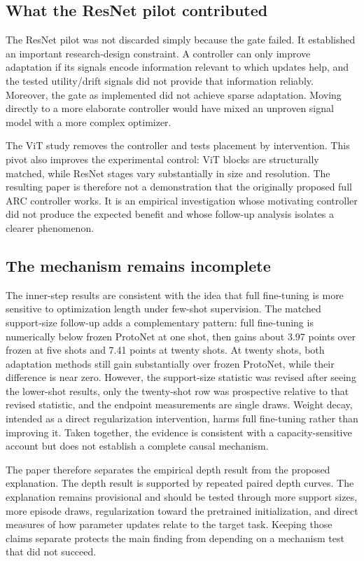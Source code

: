 \documentclass[11pt]{article}
\begin{document}
\subsection{What the ResNet pilot contributed}

The ResNet pilot was not discarded simply because the gate failed. It established an important research-design constraint. A controller can only improve adaptation if its signals encode information relevant to which updates help, and the tested utility/drift signals did not provide that information reliably. Moreover, the gate as implemented did not achieve sparse adaptation. Moving directly to a more elaborate controller would have mixed an unproven signal model with a more complex optimizer.

The ViT study removes the controller and tests placement by intervention. This pivot also improves the experimental control: ViT blocks are structurally matched, while ResNet stages vary substantially in size and resolution. The resulting paper is therefore not a demonstration that the originally proposed full ARC controller works. It is an empirical investigation whose motivating controller did not produce the expected benefit and whose follow-up analysis isolates a clearer phenomenon.

\subsection{The mechanism remains incomplete}

The inner-step results are consistent with the idea that full fine-tuning is more sensitive to optimization length under few-shot supervision. The matched support-size follow-up adds a complementary pattern: full fine-tuning is numerically below frozen ProtoNet at one shot, then gains about 3.97 points over frozen at five shots and 7.41 points at twenty shots. At twenty shots, both adaptation methods still gain substantially over frozen ProtoNet, while their difference is near zero. However, the support-size statistic was revised after seeing the lower-shot results, only the twenty-shot row was prospective relative to that revised statistic, and the endpoint measurements are single draws. Weight decay, intended as a direct regularization intervention, harms full fine-tuning rather than improving it. Taken together, the evidence is consistent with a capacity-sensitive account but does not establish a complete causal mechanism.

The paper therefore separates the empirical depth result from the proposed explanation. The depth result is supported by repeated paired depth curves. The explanation remains provisional and should be tested through more support sizes, more episode draws, regularization toward the pretrained initialization, and direct measures of how parameter updates relate to the target task. Keeping those claims separate protects the main finding from depending on a mechanism test that did not succeed.
\end{document}
